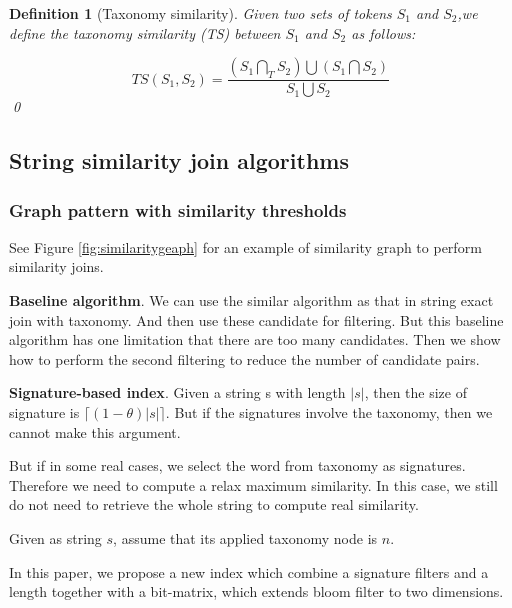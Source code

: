 \documentclass{sig-alternate}
\newtheorem{defi}[theorem]{Definition}
\newif\ifqedwritten
\newenvironment{definition}[1][]{\begin{defi}[#1]\upshape\qedwrittenfalse}{\qedhere\end{defi}}
\newcommand{\qedhere}{\ifqedwritten\else\ifmmode\tag*{\qed}\else\hfill\qed\fi\global\qedwrittentrue\fi}
\begin{document}
\begin{definition}[Taxonomy similarity]   Given two sets of tokens $S_1$ and $S_2$,we define the taxonomy similarity (TS) between $S_1$ and $S_2$ as follows:

\begin{equation}
TS(S_1,S_2)=  \frac{(S_1 \bigcap_T S_2) \bigcup (S_1 \bigcap S_2) }{S_1 \bigcup S_2}
\end{equation} \end{definition}

\subsection{String similarity join algorithms}

\subsubsection{Graph pattern with similarity thresholds}


See Figure \ref{fig:similaritygeaph} for an example of similarity graph to perform similarity joins.

\textbf{Baseline algorithm}. We can use the similar algorithm as that in string exact join with taxonomy. And then use these candidate for filtering. But this baseline algorithm has one limitation that there are too many candidates. Then we show how to perform the second filtering to reduce the number of candidate pairs.

\textbf{Signature-based index}. Given a string s with length $|s|$, then the size of signature is $\lceil (1-\theta)|s| \rceil$. But if the signatures involve the taxonomy, then we cannot make this argument.

But if in some real cases, we select the word from taxonomy as signatures. Therefore we need to compute a relax maximum similarity. In this case, we still do not need to retrieve the whole string to compute real similarity.

Given as string $s$, assume that its applied taxonomy node is $n$.

In this paper, we propose a new index which combine a signature filters and a length together with a bit-matrix, which extends bloom filter to two dimensions.
\end{document}
